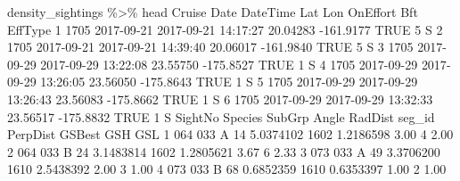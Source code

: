 \documentclass[
]{book}
\newenvironment{Shaded}{\begin{snugshade}}{\end{snugshade}}
\newcommand{\ConstantTok}[1]{\textcolor[rgb]{0.00,0.00,0.00}{#1}}
\newcommand{\DecValTok}[1]{\textcolor[rgb]{0.00,0.00,0.81}{#1}}
\newcommand{\FloatTok}[1]{\textcolor[rgb]{0.00,0.00,0.81}{#1}}
\newcommand{\NormalTok}[1]{#1}
\newcommand{\SpecialCharTok}[1]{\textcolor[rgb]{0.00,0.00,0.00}{#1}}
\begin{document}
\begin{Shaded}
\begin{Highlighting}[]
\NormalTok{density\_sightings }\SpecialCharTok{\%\textgreater{}\%}\NormalTok{ head}
\NormalTok{  Cruise       Date            DateTime      Lat       Lon OnEffort Bft EffType}
\DecValTok{1}   \DecValTok{1705} \DecValTok{2017{-}09{-}21} \DecValTok{2017{-}09{-}21} \DecValTok{14}\SpecialCharTok{:}\DecValTok{17}\SpecialCharTok{:}\DecValTok{27} \FloatTok{20.04283} \SpecialCharTok{{-}}\FloatTok{161.9177}     \ConstantTok{TRUE}   \DecValTok{5}\NormalTok{       S}
\DecValTok{2}   \DecValTok{1705} \DecValTok{2017{-}09{-}21} \DecValTok{2017{-}09{-}21} \DecValTok{14}\SpecialCharTok{:}\DecValTok{39}\SpecialCharTok{:}\DecValTok{40} \FloatTok{20.06017} \SpecialCharTok{{-}}\FloatTok{161.9840}     \ConstantTok{TRUE}   \DecValTok{5}\NormalTok{       S}
\DecValTok{3}   \DecValTok{1705} \DecValTok{2017{-}09{-}29} \DecValTok{2017{-}09{-}29} \DecValTok{13}\SpecialCharTok{:}\DecValTok{22}\SpecialCharTok{:}\DecValTok{08} \FloatTok{23.55750} \SpecialCharTok{{-}}\FloatTok{175.8527}     \ConstantTok{TRUE}   \DecValTok{1}\NormalTok{       S}
\DecValTok{4}   \DecValTok{1705} \DecValTok{2017{-}09{-}29} \DecValTok{2017{-}09{-}29} \DecValTok{13}\SpecialCharTok{:}\DecValTok{26}\SpecialCharTok{:}\DecValTok{05} \FloatTok{23.56050} \SpecialCharTok{{-}}\FloatTok{175.8643}     \ConstantTok{TRUE}   \DecValTok{1}\NormalTok{       S}
\DecValTok{5}   \DecValTok{1705} \DecValTok{2017{-}09{-}29} \DecValTok{2017{-}09{-}29} \DecValTok{13}\SpecialCharTok{:}\DecValTok{26}\SpecialCharTok{:}\DecValTok{43} \FloatTok{23.56083} \SpecialCharTok{{-}}\FloatTok{175.8662}     \ConstantTok{TRUE}   \DecValTok{1}\NormalTok{       S}
\DecValTok{6}   \DecValTok{1705} \DecValTok{2017{-}09{-}29} \DecValTok{2017{-}09{-}29} \DecValTok{13}\SpecialCharTok{:}\DecValTok{32}\SpecialCharTok{:}\DecValTok{33} \FloatTok{23.56517} \SpecialCharTok{{-}}\FloatTok{175.8832}     \ConstantTok{TRUE}   \DecValTok{1}\NormalTok{       S}
\NormalTok{  SightNo Species SubGrp Angle   RadDist seg\_id  PerpDist GSBest GSH  GSL}
\DecValTok{1}     \DecValTok{064}     \DecValTok{033}\NormalTok{      A    }\DecValTok{14} \FloatTok{5.0374102}   \DecValTok{1602} \FloatTok{1.2186598}   \FloatTok{3.00}   \DecValTok{4} \FloatTok{2.00}
\DecValTok{2}     \DecValTok{064}     \DecValTok{033}\NormalTok{      B    }\DecValTok{24} \FloatTok{3.1483814}   \DecValTok{1602} \FloatTok{1.2805621}   \FloatTok{3.67}   \DecValTok{6} \FloatTok{2.33}
\DecValTok{3}     \DecValTok{073}     \DecValTok{033}\NormalTok{      A    }\DecValTok{49} \FloatTok{3.3706200}   \DecValTok{1610} \FloatTok{2.5438392}   \FloatTok{2.00}   \DecValTok{3} \FloatTok{1.00}
\DecValTok{4}     \DecValTok{073}     \DecValTok{033}\NormalTok{      B    }\DecValTok{68} \FloatTok{0.6852359}   \DecValTok{1610} \FloatTok{0.6353397}   \FloatTok{1.00}   \DecValTok{2} \FloatTok{1.00}

\end{Highlighting}
\end{Shaded}
\end{document}
